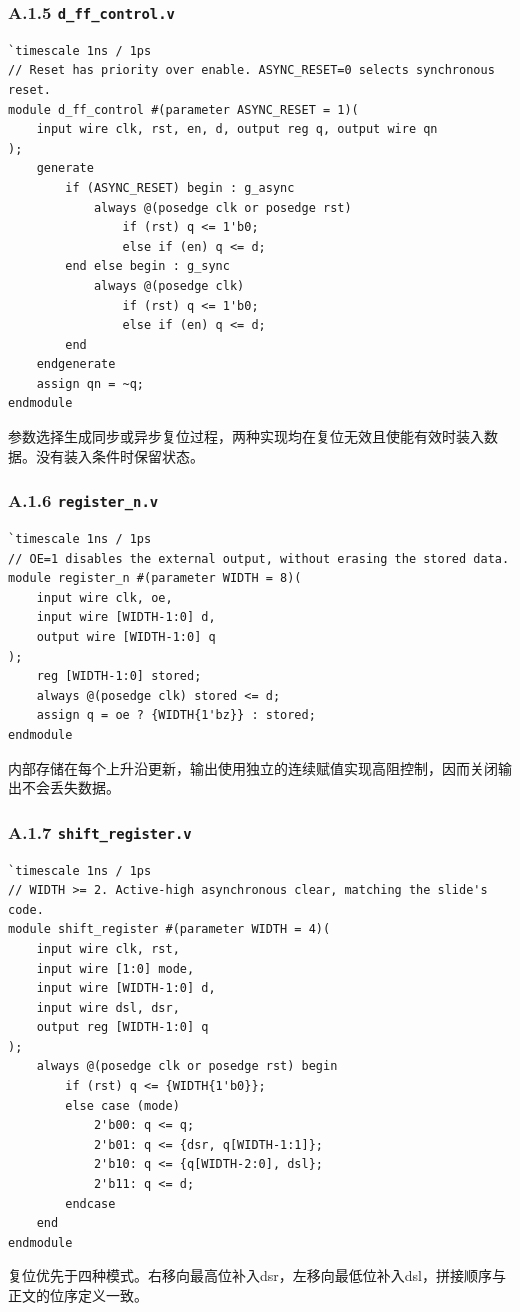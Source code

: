 \documentclass[12pt,a4paper]{ctexart}
\begin{document}
\subsubsection*{A.1.5 \texttt{d\_ff\_control.v}}
\begin{lstlisting}
`timescale 1ns / 1ps
// Reset has priority over enable. ASYNC_RESET=0 selects synchronous reset.
module d_ff_control #(parameter ASYNC_RESET = 1)(
    input wire clk, rst, en, d, output reg q, output wire qn
);
    generate
        if (ASYNC_RESET) begin : g_async
            always @(posedge clk or posedge rst)
                if (rst) q <= 1'b0;
                else if (en) q <= d;
        end else begin : g_sync
            always @(posedge clk)
                if (rst) q <= 1'b0;
                else if (en) q <= d;
        end
    endgenerate
    assign qn = ~q;
endmodule
\end{lstlisting}
参数选择生成同步或异步复位过程，两种实现均在复位无效且使能有效时装入数据。没有装入条件时保留状态。

\subsubsection*{A.1.6 \texttt{register\_n.v}}
\begin{lstlisting}
`timescale 1ns / 1ps
// OE=1 disables the external output, without erasing the stored data.
module register_n #(parameter WIDTH = 8)(
    input wire clk, oe,
    input wire [WIDTH-1:0] d,
    output wire [WIDTH-1:0] q
);
    reg [WIDTH-1:0] stored;
    always @(posedge clk) stored <= d;
    assign q = oe ? {WIDTH{1'bz}} : stored;
endmodule
\end{lstlisting}
内部存储在每个上升沿更新，输出使用独立的连续赋值实现高阻控制，因而关闭输出不会丢失数据。

\subsubsection*{A.1.7 \texttt{shift\_register.v}}
\begin{lstlisting}
`timescale 1ns / 1ps
// WIDTH >= 2. Active-high asynchronous clear, matching the slide's code.
module shift_register #(parameter WIDTH = 4)(
    input wire clk, rst,
    input wire [1:0] mode,
    input wire [WIDTH-1:0] d,
    input wire dsl, dsr,
    output reg [WIDTH-1:0] q
);
    always @(posedge clk or posedge rst) begin
        if (rst) q <= {WIDTH{1'b0}};
        else case (mode)
            2'b00: q <= q;
            2'b01: q <= {dsr, q[WIDTH-1:1]};
            2'b10: q <= {q[WIDTH-2:0], dsl};
            2'b11: q <= d;
        endcase
    end
endmodule
\end{lstlisting}
复位优先于四种模式。右移向最高位补入dsr，左移向最低位补入dsl，拼接顺序与正文的位序定义一致。
\end{document}
